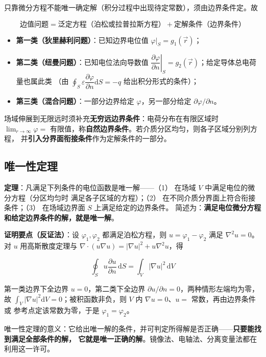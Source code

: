 只靠微分方程不能唯一确定解（积分过程中出现待定常数），须由边界条件定。故
\begin{formulaBox}
\[
\text{边值问题}=\text{泛定方程（泊松或拉普拉斯方程）}+\text{定解条件（边界条件）}
\]
\end{formulaBox}

\begin{itemize}
    \item \textbf{第一类（狄里赫利问题）}：已知边界电位值 $\varphi|_S=g_1(\vec{r})$；
    \item \textbf{第二类（纽曼问题）}：已知电位法向导数值
    $\left.\dfrac{\partial\varphi}{\partial n}\right|_S=g_2(\vec{r})$；给定导体总电荷量也属此类
    （由 $\oint_S\varepsilon\dfrac{\partial\varphi}{\partial n}\mathrm{d}S=-q$ 给出积分形式的条件）；
    \item \textbf{第三类（混合问题）}：一部分边界给定 $\varphi$，另一部分给定 $\partial\varphi/\partial n$。
\end{itemize}

场域伸展到无限远时须补充\textbf{无穷远边界条件}：电荷分布在有限区域时
$\lim_{r\to\infty}\varphi=$ 有限值，称\textbf{自然边界条件}。若介质分区均匀，则各子区域分别列方程，
并\textbf{引入分界面衔接条件}作为定解条件的一部分。

\subsection{唯一性定理}

\textbf{定理}：凡满足下列条件的电位函数是唯一解——（1） 在场域 $V$ 中满足电位的微分方程（分区均匀时
满足各子区域的方程）；（2） 在不同介质分界面上符合衔接条件；（3） 在场域边界面 $S$ 上满足给定的边界条件。
简述为：\textbf{满足电位微分方程和给定边界条件的解，就是唯一解}。

\textbf{证明要点（反证法）}：设 $\varphi_1,\varphi_2$ 都满足泊松方程，则 $u=\varphi_1-\varphi_2$
满足 $\nabla^2u=0$。对 $u$ 用高斯散度定理与 $\nabla\cdot(u\nabla u)=|\nabla u|^2+u\nabla^2u$，得
\begin{formulaBox}
\[
\oint_S u\frac{\partial u}{\partial n}\,\mathrm{d}S=\int_V|\nabla u|^2\,\mathrm{d}V
\]
\end{formulaBox}

第一类边界下全边界 $u=0$，第二类下全边界 $\partial u/\partial n=0$，两种情形左端均为零，故
$\int_V|\nabla u|^2\mathrm{d}V=0$；被积函数非负，则 $V$ 内 $\nabla u=0$、$u=$ 常数，再由边界条件或
参考点定该常数为零，于是 $\varphi_1=\varphi_2$。

唯一性定理的意义：它给出唯一解的条件，并可判定所得解是否正确——\textbf{只要能找到满足全部条件的解，
它就是唯一正确的解}。镜像法、电轴法、分离变量法都在利用这一许可。


